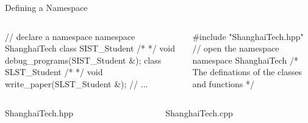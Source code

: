\begin{frame}[fragile]{Defining a Namespace}
\begin{columns}
  \begin{column}{0.5\linewidth}
    \begin{cpp}
// declare a namespace
namespace ShanghaiTech {
  class SIST_Student {/* */}
  void debug_programs(SIST_Student &);
  class SLST_Student {/* */}
  void write_paper(SLST_Student &);
  // ...
}
   \end{cpp}
  \end{column}
  \begin{column}{0.5\linewidth}
  \begin{cpp}
#include "ShanghaiTech.hpp"
// open the namespace
namespace ShanghaiTech {
  /* The definations of the classes and functions */
}
  \end{cpp}
  \end{column}
\end{columns}
\begin{columns}
  \begin{column}{0.5\linewidth}
    ShanghaiTech.hpp
  \end{column}
  \begin{column}{0.5\linewidth}
    ShanghaiTech.cpp
  \end{column}
\end{columns}
\end{frame}

